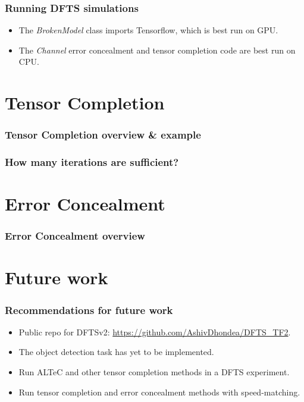 \documentclass{beamer}
\begin{document}
\begin{frame}
	\frametitle{Running DFTS simulations}
	\begin{itemize}
		\item The \textit{BrokenModel} class imports Tensorflow, which is best run on GPU.
		\item The \textit{Channel} error concealment and tensor completion code are best run on CPU.
	\end{itemize}
\end{frame}



\section{Tensor Completion}
\begin{frame}
	\frametitle{Tensor Completion overview \& example}
\end{frame}

\begin{frame}
	\frametitle{How many iterations are sufficient?}
\end{frame}

\section{Error Concealment}
\begin{frame}
	\frametitle{Error Concealment overview}
\end{frame}


\section{Future work}
\begin{frame}
\frametitle{Recommendations for future work}

\begin{itemize}
	\item Public repo for DFTSv2: \url{https://github.com/AshivDhondea/DFTS_TF2}.
	\item The object detection task has yet to be implemented.
	\item Run ALTeC and other tensor completion methods in a DFTS experiment.
	\item Run tensor completion and error concealment methods with speed-matching.
\end{itemize}



\end{frame}



\end{document}
